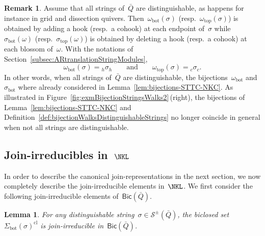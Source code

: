 \documentclass{amsart}
\newtheorem{lemma}[theorem]{Lemma}
\theoremstyle{definition}
\newtheorem{remark}[theorem]{Remark}
\newcommand{\fref}[1]{Figure~\ref{#1}} %
\newcommand{\strings}{\mathcal{S}} %
\renewcommand{\top}{\mathrm{top}} %
\newcommand{\bottom}{\mathrm{bot}} %
\newcommand{\closure}[1]{#1^{\mathrm{cl}}} %
\newcommand{\Bicl}[1]{\mathsf{Bic}(#1)} %
\begin{document}
\begin{remark}
Assume that all strings of~$\bar Q$ are distinguishable, as happens for instance in grid and dissection quivers.
Then~$\omega_\bottom(\sigma)$ (resp.~$\omega_\top(\sigma)$) is obtained by adding a hook (resp.~a cohook) at each endpoint of~$\sigma$ while $\sigma_\bottom(\omega)$ (resp.~$\sigma_\top(\omega)$) is obtained by deleting a hook (resp.~a cohook) at each blossom of~$\omega$.
With the notations of Section~\ref{subsec:ARtranslationStringModules},
\[
\omega_\bottom(\sigma) = {}_h\sigma_h
\qquad\text{and}\qquad
\omega_\top(\sigma) = {}_c\sigma_c.
\]
In other words, when all strings of~$\bar Q$ are distinguishable, the bijections~$\omega_\bottom$ and~$\sigma_\bottom$ where already considered in Lemma~\ref{lem:bijections-STTC-NKC}.
As illustrated in \fref{fig:exmBijectionStringsWalks2}\,(right), the bijections of Lemma~\ref{lem:bijections-STTC-NKC} and Definition~\ref{def:bijectionWalksDistinguishableStrings} no longer coincide in general when not all strings are distinguishable.
\end{remark}

\subsection{Join-irreducibles in~$\NKL$}

In order to describe the canonical join-representations in the next section, we now completely describe the join-irreducible elements in~$\NKL$.
We first consider the following join-irreducible elements of~$\Bicl{\bar Q}$.

\begin{lemma}
\label{lem:exmBiclosedJI}
For any distinguishable string~$\sigma \in \strings^\pm(\bar Q)$, the biclosed set~$\closure{\Sigma_\bottom(\sigma)}$ is join-irreducible in~$\Bicl{\bar Q}$.
\end{lemma}
\end{document}
